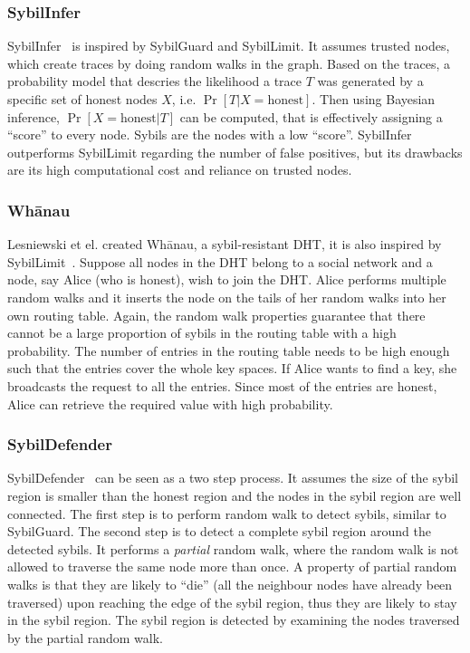 \subsubsection{SybilInfer}
SybilInfer~\cite{danezis2009sybilinfer} is inspired by SybilGuard and
SybilLimit. It assumes trusted nodes, which create traces by doing random walks
in the graph. Based on the traces, a probability model that descries the
likelihood a trace $T$ was generated by a specific set of honest nodes $X$, i.e.
$\Pr[ T | X = \text{honest}]$. Then using Bayesian inference, $\Pr[ X =
\text{honest}| T ]$ can be computed, that is effectively assigning a ``score''
to every node. Sybils are the nodes with a low ``score''. SybilInfer outperforms
SybilLimit regarding the number of false positives, but its drawbacks are its
high computational cost and reliance on trusted nodes.

\subsubsection{Wh\={a}nau}
Lesniewski et el. created Wh\={a}nau, a sybil-resistant DHT, it is also inspired
by SybilLimit~\cite{lesniewski2008sybil, lesniewski2010whanau}. Suppose all nodes
in the DHT belong to a social network and a node, say Alice (who is honest),
wish to join the DHT. Alice performs multiple random walks and it inserts the
node on the tails of her random walks into her own routing table. Again, the
random walk properties guarantee that there cannot be a large proportion of
sybils in the routing table with a high probability. The number of entries in
the routing table needs to be high enough such that the entries cover the whole
key spaces. If Alice wants to find a key, she broadcasts the request to all the
entries. Since most of the entries are honest, Alice can retrieve the required
value with high probability.

\subsubsection{SybilDefender}
SybilDefender~\cite{wei2012sybildefender} can be seen as a two step process. It
assumes the size of the sybil region is smaller than the honest region and the
nodes in the sybil region are well connected. The first step is to perform
random walk to detect sybils, similar to SybilGuard. The second step is to
detect a complete sybil region around the detected sybils. It performs a
\emph{partial} random walk, where the random walk is not allowed to traverse the
same node more than once. A property of partial random walks is that they are
likely to ``die'' (all the neighbour nodes have already been traversed) upon
reaching the edge of the sybil region, thus they are likely to stay in the sybil
region. The sybil region is detected by examining the nodes traversed by the
partial random walk.

